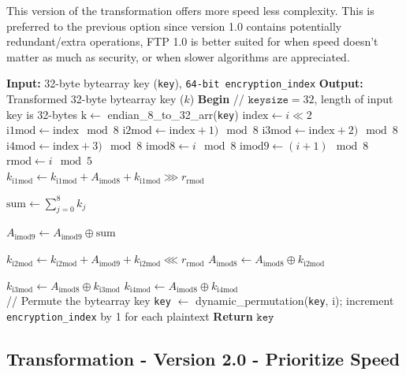 \documentclass[11pt]{article}
\theoremstyle{definition}
\theoremstyle{remark}
\newcommand{\COMMENT}[1]{\State \textcolor[HTML]{003e57}{// #1}}
\begin{document}
This version of the transformation offers more speed less complexity. This is preferred to the previous option since version 1.0 contains potentially redundant/extra operations, FTP 1.0 is better suited for when speed doesn't matter as much as security, or when slower algorithms are appreciated.

\begin{algorithm}[H] %
\caption{The key transformation operation per encryption}
\begin{algorithmic}[1]  %
\State \textbf{Input:} 32-byte bytearray key (\texttt{key}), \texttt{64-bit encryption\_index}
\State \textbf{Output:} Transformed 32-byte bytearray key ($k$)
\State \textbf{Begin}
\COMMENT{$\texttt{keysize} = 32$, length of input key is 32-bytes}
\State $\mathrm{k} \gets$ endian\_8\_to\_32\_arr(\texttt{key})
	\State $\mathrm{index} \gets i \ll 2$
	\State $\mathrm{i1mod} \gets \mathrm{index} \mod 8$
	\State $\mathrm{i2mod} \gets \mathrm{index}+1) \mod 8$
	\State $\mathrm{i3mod} \gets \mathrm{index}+2) \mod 8$
	\State $\mathrm{i4mod} \gets \mathrm{index}+3) \mod 8$
	\State $\mathrm{imod8} \gets i \mod 8$
	\State $\mathrm{imod9} \gets (i+1) \mod 8$
	\State $\mathrm{rmod} \gets i \mod 5$ \\

	\State $k_\mathrm{i1mod} \gets k_\mathrm{i1mod} + A_\mathrm{imod8} + k_\mathrm{i1mod} \ggg r_\mathrm{rmod}$

	\State $ \mathrm{sum} \gets \displaystyle \sum_{j=0}^8 k_j$

	\State $A_\mathrm{imod9} \gets A_\mathrm{imod9} \oplus \mathrm{sum}$

	\State $k_\mathrm{i2mod} \gets k_\mathrm{i2mod} + A_\mathrm{imod9} + k_\mathrm{i2mod} \lll r_\mathrm{rmod}$
	\State $A_\mathrm{imod8} \gets A_\mathrm{imod8} \oplus k_\mathrm{i2mod}$

	\State $k_\mathrm{i3mod} \gets A_\mathrm{imod8} \oplus k_\mathrm{i3mod}$
	\State $k_\mathrm{i4mod} \gets A_\mathrm{imod8} \oplus k_\mathrm{i4mod}$ \\

	\COMMENT{Permute the bytearray key}
	\State \texttt{key} $\gets$ dynamic\_permutation(\texttt{key}, i);
\EndFor
\State increment \texttt{encryption\_index} by 1 for each plaintext
\State \textbf{Return} $\texttt{key}$
\end{algorithmic}
\end{algorithm}

\subsection{Transformation - Version 2.0 - Prioritize Speed}
\end{document}
